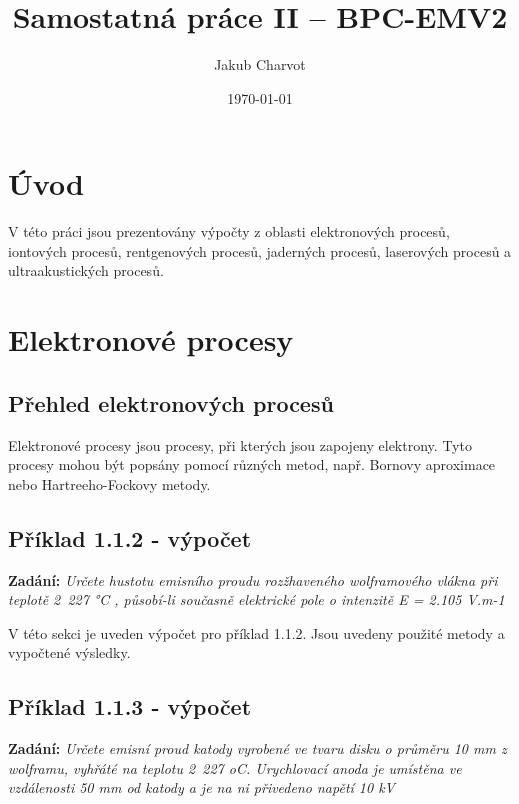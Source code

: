 \documentclass{article}
\newenvironment{zadani}
{\begin{center}\textbf{Zadání:}\itshape}{\end{center}}
\begin{document}
\title{Samostatná práce II – BPC-EMV2}
\author{Jakub Charvot}
\date{\czdate\today}
\maketitle

\section{Úvod}

V této práci jsou prezentovány výpočty z oblasti elektronových procesů, iontových procesů, rentgenových procesů, jaderných procesů, laserových procesů a ultraakustických procesů.

\section{Elektronové procesy}

\subsection{Přehled elektronových procesů}

Elektronové procesy jsou procesy, při kterých jsou zapojeny elektrony. Tyto procesy mohou být popsány pomocí různých metod, např. Bornovy aproximace nebo Hartreeho-Fockovy metody.

\subsection{Příklad 1.1.2 - výpočet}
\begin{zadani}
    Určete hustotu emisního proudu rozžhaveného wolframového vlákna 
    při teplotě 2 227 °C , působí-li současně elektrické pole o intenzitě 
    E = 2.105 V.m-1
\end{zadani}

V této sekci je uveden výpočet pro příklad 1.1.2. Jsou uvedeny použité metody a vypočtené výsledky.

\subsection{Příklad 1.1.3 - výpočet}
\begin{zadani}
    Určete emisní proud katody vyrobené ve tvaru disku o průměru 10 mm
    z wolframu, vyhřáté na teplotu 2 227 oC. Urychlovací anoda je umístěna 
    ve vzdálenosti  50 mm  od katody a je na ni přivedeno napětí  10 kV
\end{zadani}
\end{document}
